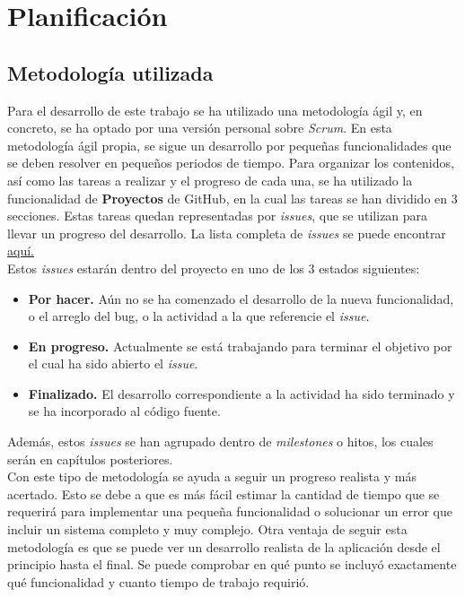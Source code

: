 \chapter{Planificación}
\section{Metodología utilizada}

Para el desarrollo de este trabajo se ha utilizado una metodología ágil y, en concreto, se ha optado por una versión personal sobre \textit{Scrum}\cite{scrum}. En esta metodología
ágil propia, se sigue un desarrollo por pequeñas funcionalidades que se deben resolver en pequeños periodos de tiempo. Para organizar los contenidos, así como las tareas
a realizar y el progreso de cada una, se ha utilizado la funcionalidad de \textbf{Proyectos} de GitHub, en la cual las tareas se han dividido en 3 secciones. Estas tareas
quedan representadas por \textit{issues}, que se utilizan para llevar un progreso del desarrollo. La lista completa de \textit{issues} se puede encontrar \href{https://github.com/Cerv1/Chief/issues?q=is\%3Aissue+is\%3Aclosed}{aquí.} \\

Estos \textit{issues} estarán dentro del proyecto en uno de los 3 estados siguientes:

\begin{itemize}
	\item \textbf{Por hacer.} Aún no se ha comenzado el desarrollo de la nueva funcionalidad, o el arreglo del bug, o la actividad a la que referencie el \textit{issue}.
	\item \textbf{En progreso.} Actualmente se está trabajando para terminar el objetivo por el cual ha sido abierto el \textit{issue}.
	\item \textbf{Finalizado. } El desarrollo correspondiente a la actividad ha sido terminado y se ha incorporado al código fuente.
\end{itemize}

Además, estos \textit{issues} se han agrupado dentro de \textit{milestones} o hitos, los cuales serán en capítulos posteriores.\\

Con este tipo de metodología se ayuda a seguir un progreso realista y más acertado. Esto se debe a que es más fácil estimar la cantidad de tiempo que se requerirá para
implementar una pequeña funcionalidad o solucionar un error que incluir un sistema completo y muy complejo. Otra ventaja de seguir esta metodología es que se puede ver
un desarrollo realista de la aplicación desde el principio hasta el final. Se puede comprobar en qué punto se incluyó exactamente qué funcionalidad y cuanto tiempo de 
trabajo requirió. 

